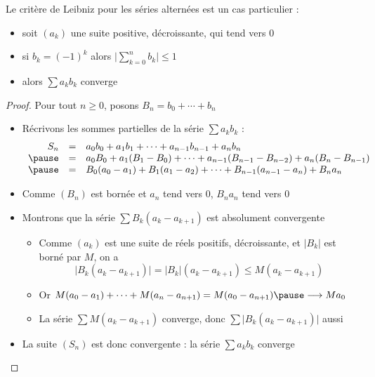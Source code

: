 \begin{frame}
Le critère de Leibniz pour les séries alternées est un cas particulier :
\begin{itemize}
\item\pause soit $(a_k)$ une suite positive, décroissante, qui tend vers $0$
\item\pause si $b_k=(-1)^k$ alors $\big|\sum_{k=0}^n b_k\big|\le 1$
\item\pause alors $\sum a_k b_k$ converge
\end{itemize}
\end{frame}


\begin{frame}
\begin{proof}
\pause
Pour tout $n\ge0$, posons $B_n=b_0+\cdots+b_n$
\begin{itemize}
\item\pause Récrivons les sommes partielles de la série $\sum a_k b_k$ :
$$
\begin{array}{rcl}
S_n & = & a_0b_0+a_1b_1+\cdots+a_{n-1}b_{n-1}+a_nb_n \\ \pause
&=& a_0B_0+a_1(B_1-B_0)+\cdots +a_{n-1}(B_{n-1}-B_{n-2}) + a_n(B_n-B_{n-1})\\ \pause
&=& B_0(a_0-a_1)+B_1(a_1-a_2)+\cdots+B_{n-1}(a_{n-1}-a_n)+B_na_n
\end{array}
$$
\item\pause Comme $(B_n)$ est bornée et $a_n$ tend vers $0$, $B_na_n$ tend vers $0$
\item\pause Montrons que la série $\sum B_k(a_k-a_{k+1})$ est absolument convergente
\begin{itemize}
\item\pause Comme $(a_k)$ est une suite de réels positifs,
décroissante, et $|B_k|$ est borné par $M$, \pause on a
$$
\big|B_k(a_k-a_{k+1})\big| = \big|B_k\big|(a_k-a_{k+1})\le M(a_k-a_{k+1})
$$
\item\pause Or
$
M(a_0-a_1)+\cdots+M(a_n-a_{n+1}) = M(a_0-a_{n+1}) \pause \longrightarrow Ma_0
$
\item\pause La série $\sum M(a_k-a_{k+1})$ converge, donc $\sum\big|B_k(a_k-a_{k+1})\big|$ aussi
\end{itemize}
\item\pause La suite $(S_n)$ est donc convergente : la série $\sum a_k b_k$ converge \qedhere
\end{itemize}
\end{proof}
\end{frame}




